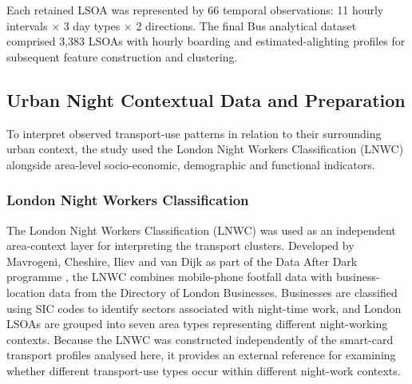 Each retained LSOA was represented by 66 temporal observations: 11 hourly intervals $\times$ 3 day types $\times$ 2 directions. The final Bus analytical dataset comprised 3,383 LSOAs with hourly boarding and estimated-alighting profiles for subsequent feature construction and clustering.

\subsection{Urban Night Contextual Data and Preparation}

To interpret observed transport-use patterns in relation to their surrounding urban context, the study used the London Night Workers Classification (LNWC) alongside area-level socio-economic, demographic and functional indicators.

\subsubsection{London Night Workers Classification}

The London Night Workers Classification (LNWC) was used as an independent area-context layer for interpreting the transport clusters. Developed by Mavrogeni, Cheshire, Iliev and van Dijk as part of the Data After Dark programme \citep{Mavrogeni2025}, the LNWC combines mobile-phone footfall data with business-location data from the Directory of London Businesses. Businesses are classified using SIC codes to identify sectors associated with night-time work, and London LSOAs are grouped into seven area types representing different night-working contexts. Because the LNWC was constructed independently of the smart-card transport profiles analysed here, it provides an external reference for examining whether different transport-use types occur within different night-work contexts.

